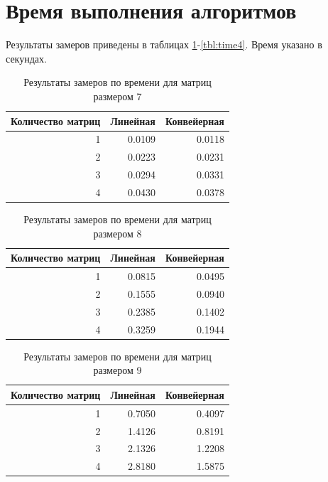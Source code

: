 \clearpage
\section{Время выполнения алгоритмов}
\hspace{\parindent}Результаты замеров приведены в таблицах \ref{tbl:time1}-\ref{tbl:time4}. Время указано в секундах.

\begin{table}[h]
    \begin{center}
    	\centering
    	\captionsetup{skip=0pt,justification=raggedright,singlelinecheck=off}
        \caption{Результаты замеров по времени для матриц размером 7}
        \label{tbl:time1}
        \begin{tabular}{|r|r|r|}
            \hline
            Количество матриц & Линейная & Конвейерная\\
           \hline
           1 & 0.0109 & 0.0118 \\
           \hline
           2 & 0.0223 & 0.0231 \\
           \hline
           3 & 0.0294 & 0.0331 \\
           \hline
           4 & 0.0430 & 0.0378 \\
           \hline
		\end{tabular}
	\end{center}
\end{table}
\begin{table}[h]
	\begin{center}
		\centering
		\captionsetup{skip=0pt,justification=raggedright,singlelinecheck=off}
		\caption{Результаты замеров по времени для матриц размером 8}
		\label{tbl:time2}
		\begin{tabular}{|r|r|r|}
			\hline
			Количество матриц & Линейная & Конвейерная\\
			\hline
			1 & 0.0815 & 0.0495 \\
			\hline
			2 & 0.1555 & 0.0940 \\
			\hline
			3 & 0.2385 & 0.1402 \\
			\hline
			4 & 0.3259 & 0.1944 \\
			\hline
		\end{tabular}
	\end{center}
\end{table}
\begin{table}[h]
	\begin{center}
		\centering
		\captionsetup{skip=0pt,justification=raggedright,singlelinecheck=off}
		\caption{Результаты замеров по времени для матриц размером 9}
		\label{tbl:time3}
		\begin{tabular}{|r|r|r|}
			\hline
			Количество матриц & Линейная & Конвейерная\\
			\hline
			1 & 0.7050 & 0.4097 \\
			\hline
			2 & 1.4126 & 0.8191 \\
			\hline
			3 & 2.1326 & 1.2208 \\
			\hline
			4 & 2.8180 & 1.5875 \\
			\hline
		\end{tabular}
	\end{center}
\end{table}
